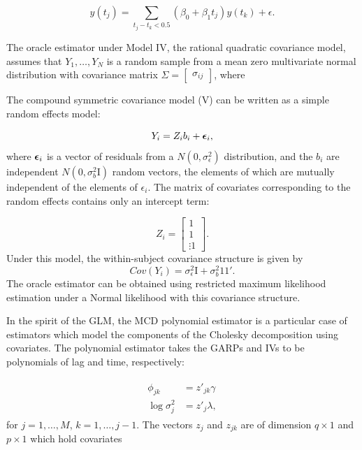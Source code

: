 \begin{equation} \label{eq:model-3-oracle-model}
y\left(t_j\right) = \sum_{ t_j - t_k < 0.5} \left(\beta_0 + \beta_1 t_j\right) y\left( t_k \right) + \epsilon. 
\end{equation}

The oracle estimator under Model IV, the rational quadratic covariance model, assumes that $Y_1, \dots, Y_N$ is a random sample from a mean zero multivariate normal distribution with covariance matrix $\Sigma = \begin{bmatrix} \sigma_{ij} \end{bmatrix}$, where 

The compound symmetric covariance model (V) can be written as a simple random effects model:

\begin{equation} \label{eq:model-5-oracle-model}
Y_i = Z_i b_i + \mbox{\boldmath $\epsilon$}_i,
\end{equation}
\noindent
where $\mbox{\boldmath $\epsilon$}_i$ is a vector of residuals from a $N\left(0,\sigma_\epsilon^2\right)$ distribution, and the $b_i$ are independent $N\left(0,\sigma_b^2 \mathrm{I}\right)$ random vectors, the elements of which are mutually independent of the elements of $\epsilon_{i}$. The matrix of covariates corresponding to the random effects contains only an intercept term:

\[
Z_i = \begin{bmatrix}  1 \\ 1 \\ \vdots 1 \end{bmatrix}.
\]
\noindent
Under this model, the within-subject covariance structure is given by
\[
Cov\left(Y_i\right) = \sigma_\epsilon^2 \mathrm{I} +  \sigma_b^2 1 1'. 
\]
\noindent
The oracle estimator can be obtained using restricted maximum likelihood estimation under a Normal likelihood with this covariance structure.
\bigskip

In the spirit of the GLM, the MCD polynomial estimator is a particular case of estimators which model the components of the Cholesky decomposition using covariates. The polynomial estimator takes the GARPs and IVs to be polynomials of lag and time, respectively:

\begin{align*}
\begin{split}  \label{eq:GARP-IV-parametric-model}
\phi_{jk} &= z'_{jk} \gamma \\
\log \sigma^2_{j} &= z'_{j}\lambda, 
\end{split}
\end{align*}
\noindent
for $j = 1,\dots, M$, $k = 1,\dots, j-1$. The vectors $z_j$ and $z_{jk}$ are of dimension $q \times 1$ and $p \times 1$  which hold covariates

